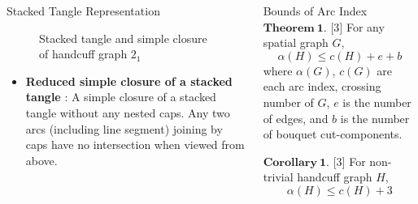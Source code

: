 \documentclass[final]{beamer}
\begin{document}
\begin{frame}[t]
\begin{columns}[t]
\begin{block}{Stacked Tangle Representation}
\begin{figure}
      \caption{Stacked tangle and simple closure of handcuff graph $2_1$}
    \end{figure}
    \begin{itemize}
      \item \textbf{Reduced simple closure of a stacked tangle} : A simple closure of a stacked tangle without any nested caps. Any two arcs (including line segment) joining by caps have no intersection when viewed from above.
    \end{itemize}
  \end{block}

  
  \begin{block}{Bounds of Arc Index}
  $\mathbf{Theorem\ 1.}$ $[$3$]$ For any spatial graph $G$, 
  \begin{equation*}
    \alpha(H) \leq c(H) + e + b
  \end{equation*}
  where $\alpha (G)$, $c(G)$ are each arc index, crossing number of $G$, $e$ is the number of edges, and $b$ is the number of bouquet cut-components.
  
  $\mathbf{Corollary\ 1.}$ $[$3$]$ For non-trivial handcuff graph $H$,
  \begin{equation*}
    \alpha(H) \leq c(H) + 3
  \end{equation*}





\end{block}
\end{columns}
\end{frame}
\end{document}
